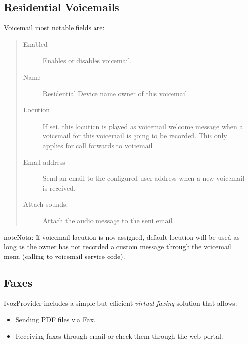 \documentclass[letterpaper,10pt,spanish]{sphinxmanual}
\begin{document}
\subsection{Residential Voicemails}
\label{administration_portal/client/residential/residential_voicemails:residential-voicemails}\label{administration_portal/client/residential/residential_voicemails::doc}\label{administration_portal/client/residential/residential_voicemails:id1}
Voicemail most notable fields are:
\begin{quote}
\begin{description}
\item[{Enabled}] \leavevmode
Enables or disables voicemail.

\item[{Name}] \leavevmode
Residential Device name owner of this voicemail.

\item[{Locution}] \leavevmode
If set, this locution is played as voicemail welcome message when a voicemail
for this voicemail is going to be recorded. This only applies for call forwards
to voicemail.

\item[{Email address}] \leavevmode
Send an email to the configured user address when a new voicemail is received.

\item[{Attach sounds:}] \leavevmode
Attach the audio message to the sent email.

\end{description}
\end{quote}

\begin{notice}{note}{Nota:}
If voicemail locution is not assigned, default locution will be used as long as
the owner has not recorded a custom message through the voicemail menu (calling to
voicemail service code).
\end{notice}


\subsection{Faxes}
\label{administration_portal/client/residential/faxes:faxes}\label{administration_portal/client/residential/faxes::doc}
IvozProvider includes a simple but efficient \emph{virtual faxing} solution that allows:
\begin{itemize}
\item {} 
Sending PDF files via Fax.

\item {} 
Receiving faxes through email or check them through the web portal.

\end{itemize}
\end{document}
